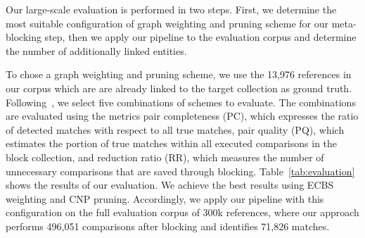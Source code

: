 Our large-scale evaluation is performed in two steps. First, we determine the most suitable configuration of graph weighting and pruning scheme for our meta-blocking step, then we apply our pipeline to the evaluation corpus and determine the number of additionally linked entities.

To chose a graph weighting and pruning scheme, we use the 13,976 references in our corpus which are are already linked to the target collection as ground truth. Following~\cite{Papadakis2014}, we select five combinations of schemes to evaluate. The combinations are evaluated using the metrics pair completeness (PC), which expresses the ratio of detected matches with respect to all true matches, pair quality (PQ), which estimates the portion of true matches within all executed comparisons in the block collection, and reduction ratio (RR), which measures the number of unnecessary comparisons that are saved through blocking. Table~\ref{tab:evaluation} shows the results of our evaluation. We achieve the best results using ECBS weighting and CNP pruning. Accordingly, we apply our pipeline with this configuration on the full evaluation corpus of 300k references, where our approach performs 496,051 comparisons after blocking and identifies 71,826 matches.

